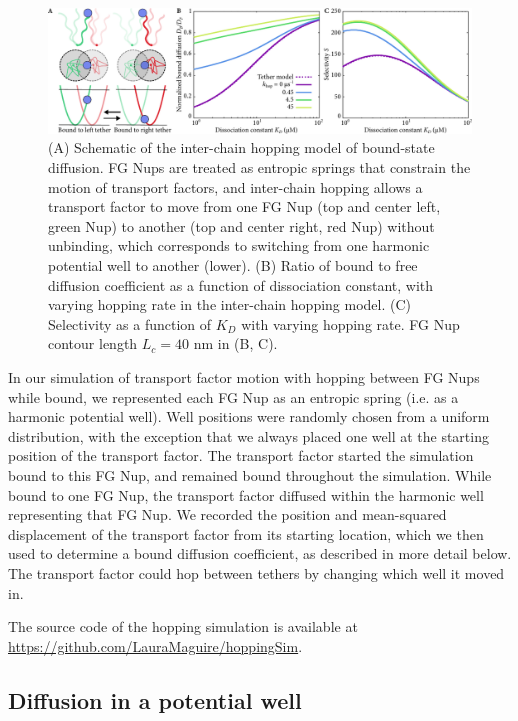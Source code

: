 \begin{figure}
\centering
\includegraphics[width = \textwidth]{figs/ch02/fig4.pdf}
\caption[Selectivity from inter-chain hopping.]{(A) Schematic of the inter-chain hopping model of bound-state diffusion. FG Nups are treated as entropic springs that constrain the motion of transport factors, and inter-chain hopping allows a transport factor to move from one FG Nup (top and center left, green Nup) to another (top and center right, red Nup) without unbinding, which corresponds to switching from one harmonic potential well to another (lower). (B) Ratio of bound to free diffusion coefficient as a function of dissociation constant, with varying hopping rate in the inter-chain hopping model.  (C) Selectivity as a function of $K_D$ with varying hopping rate. FG Nup contour length $L_c = 40$ nm in (B, C). }
\label{fig:hopping}
\end{figure}

In our simulation of transport factor motion with hopping between FG Nups while bound, we represented each FG Nup as an entropic spring (i.e. as a harmonic potential well).  Well positions were randomly chosen from a uniform distribution, with the exception that we always placed one well at the starting position of the transport factor.  The transport factor started the simulation bound to this FG Nup, and remained bound throughout the simulation.  While bound to one FG Nup, the transport factor diffused within the harmonic well representing that FG Nup. We recorded the position and mean-squared displacement of the transport factor from its starting location, which we then used to determine a bound diffusion coefficient, as described in more detail below.  The transport factor could hop between tethers by changing which well it moved in.

The source code of the hopping simulation is available at \url{https://github.com/LauraMaguire/hoppingSim}.

\subsection{Diffusion in a potential well}

